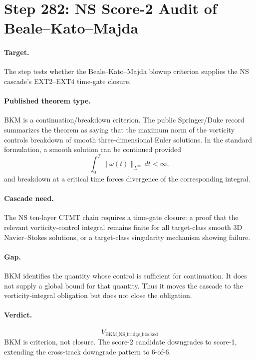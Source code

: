 \section*{Step 282: NS Score-2 Audit of Beale--Kato--Majda}

\paragraph{Target.}
The step tests whether the Beale--Kato--Majda blowup criterion supplies the NS cascade's EXT2--EXT4 time-gate closure.

\paragraph{Published theorem type.}
BKM is a continuation/breakdown criterion.  The public Springer/Duke record summarizes the theorem as saying that the maximum norm of the vorticity controls breakdown of smooth three-dimensional Euler solutions.  In the standard formulation, a smooth solution can be continued provided
\[
  \int_0^T \|\omega(t)\|_{L^\infty}\,dt < \infty,
\]
and breakdown at a critical time forces divergence of the corresponding integral.

\paragraph{Cascade need.}
The NS ten-layer CTMT chain requires a time-gate closure: a proof that the relevant vorticity-control integral remains finite for all target-class smooth 3D Navier--Stokes solutions, or a target-class singularity mechanism showing failure.

\paragraph{Gap.}
BKM identifies the quantity whose control is sufficient for continuation.  It does not supply a global bound for that quantity.  Thus it moves the cascade to the vorticity-integral obligation but does not close the obligation.

\paragraph{Verdict.}
\[
  \boxed{V_{\mathrm{BKM\_NS\_bridge\_blocked}}}
\]
BKM is criterion, not closure.  The score-2 candidate downgrades to score-1, extending the cross-track downgrade pattern to 6-of-6.
